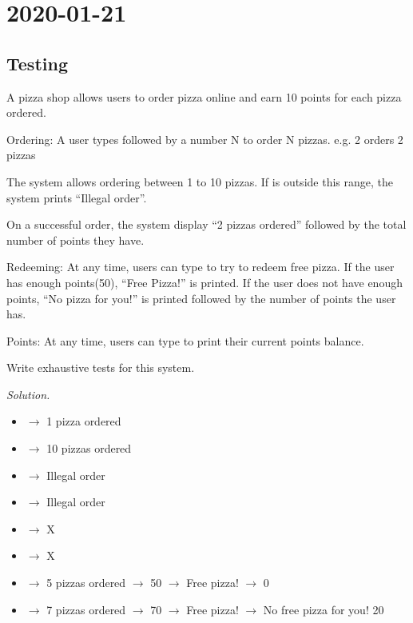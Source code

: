 \section{2020-01-21}
\subsection{Testing}
A pizza shop allows users to order pizza online and earn 10 points for each pizza
ordered.

Ordering: A user types  followed by a number N to order N pizzas.
e.g.  2 orders 2 pizzas

The system allows ordering between 1 to 10 pizzas.
If  is outside this range, the system prints ``Illegal order''.

On a successful order, the system display ``2 pizzas ordered''
followed by the total number of points they have.

Redeeming: At any time, users can type  to try to redeem free pizza.
If the user has enough points(50), ``Free Pizza!'' is printed.
If the user does not have enough points, ``No pizza for you!''
is printed followed by the number of points the user has.

Points: At any time, users can type  to print their current points balance.

Write exhaustive tests for this system.

\emph{Solution.}

\begin{itemize}
    \item {} $ \rightarrow $ 1 pizza ordered
    \item {} $ \rightarrow $ 10 pizzas ordered
    \item {} $ \rightarrow $ Illegal order
    \item {} $ \rightarrow $ Illegal order
    \item {} $ \rightarrow $ X
    \item {} $ \rightarrow $ X
    \item {} $ \rightarrow $ 5 pizzas ordered
    \subitem {} $ \rightarrow $ 50
    \subitem {} $ \rightarrow $ Free pizza!
    \subitem {} $ \rightarrow $ 0
    \item {} $ \rightarrow $ 7 pizzas ordered
    \subitem {} $ \rightarrow $ 70
    \subitem {} $ \rightarrow $ Free pizza!
    \subitem {} $ \rightarrow $ No free pizza for you! 20
\end{itemize}

